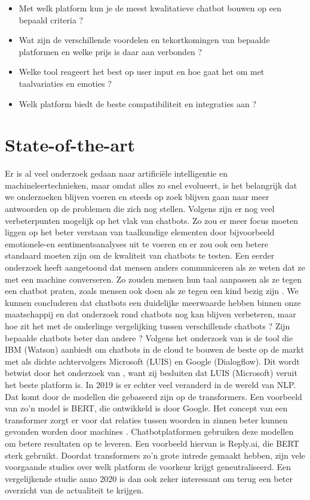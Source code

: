 \begin{itemize}
  \item Met welk platform kun je de meest kwalitatieve chatbot bouwen op een bepaald criteria ? 
  \item Wat zijn de verschillende voordelen en tekortkomingen van bepaalde platformen en welke prijs is daar aan verbonden ?
  \item Welke tool reageert het best op user input en hoe gaat het om met taalvariaties en emoties ?
  \item Welk platform biedt de beste compatibiliteit en integraties aan ?
\end{itemize}


\section{State-of-the-art}
\label{sec:state-of-the-art}
Er is al veel onderzoek gedaan naar artificiële intelligentie en machineleertechnieken, maar omdat alles zo snel evolueert, is het belangrijk dat we onderzoeken blijven voeren en steeds op zoek blijven  gaan naar meer antwoorden op de problemen die zich nog stellen. Volgens  \textcite{Hussain2019} zijn er nog veel verbeterpunten mogelijk op het vlak van chatbots. Zo zou er meer focus moeten liggen op het beter verstaan van taalkundige elementen door bijvoorbeeld emotionele-en sentimentsanalyses uit te voeren en er zou ook een betere standaard moeten zijn om de kwaliteit van chatbots te testen. Een eerder onderzoek heeft aangetoond dat mensen anders communiceren als ze weten dat ze met een machine converseren. Zo zouden mensen hun taal aanpassen als ze tegen een chatbot praten, zoals mensen ook doen als ze tegen een kind bezig zijn \autocite{Hill2015}.
We kunnen concluderen dat chatbots een duidelijke meerwaarde hebben binnen onze maatschappij en dat onderzoek rond chatbots nog kan blijven verbeteren, maar hoe zit het met de onderlinge vergelijking tussen verschillende chatbots ? Zijn bepaalde chatbots beter dan andere ? Volgens het onderzoek van \textcite{Russis2018} is de tool die IBM (Watson) aanbiedt om chatbots in de cloud te bouwen de beste op de markt met als dichte achtervolgers Microsoft (LUIS) en Google (Dialogflow). Dit wordt betwist door het onderzoek van \textcite{Langen2017}, want zij besluiten dat LUIS (Microsoft) veruit het beste platform is. In 2019 is er echter veel veranderd in de wereld van NLP. Dat komt door de modellen die gebaseerd zijn op de transformers. Een voorbeeld van zo’n model is BERT, die ontwikkeld is door Google. Het concept van een transformer zorgt er voor dat relaties tussen woorden in zinnen beter kunnen gevonden worden door machines \autocite{Joshi2019}. Chatbotplatformen gebruiken deze modellen om betere resultaten op te leveren. Een voorbeeld hiervan is Reply.ai, die BERT sterk gebruikt. Doordat transformers zo’n grote intrede gemaakt hebben, zijn vele voorgaande studies over welk platform de voorkeur krijgt geneutraliseerd. Een vergelijkende studie anno 2020 is dan ook zeker interessant om terug een beter overzicht van de actualiteit te krijgen.


